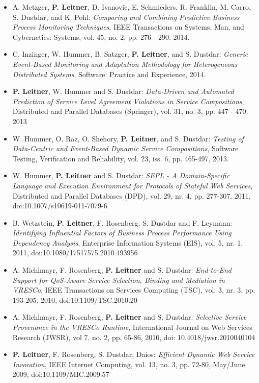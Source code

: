 \documentclass[paper=letter,fontsize=11pt]{scrartcl} %
\begin{document}
\begin{itemize}
  \item  A. Metzger, \textbf{P. Leitner}, D. Ivanovic, E. Schmieders, R. Franklin, M. Carro, S. Dustdar, and K. Pohl: \emph{Comparing and Combining Predictive Business Process Monitoring Techniques}, IEEE Transactions on Systems, Man, and Cybernetics: Systems, vol. 45, no. 2, pp. 276 - 290. 2014.
  \item C. Inzinger, W. Hummer, B. Satzger, \textbf{P. Leitner}, and S. Dustdar: \emph{Generic Event-Based Monitoring and Adaptation Methodology for Heterogeneous Distributed Systems}, Software: Practice and Experience, 2014.
  \item \textbf{P. Leitner}, W. Hummer and S. Dustdar: \emph{Data-Driven and Automated Prediction of Service Level Agreement Violations in Service Compositions}, Distributed and Parallel Databases (Springer), vol. 31, no. 3, pp. 447 - 470. 2013
  \item W. Hummer, O. Raz, O. Shehory, \textbf{P. Leitner}, and S. Dustdar: \emph{Testing of Data-Centric and Event-Based Dynamic Service Compositions}, Software Testing, Verification and Reliability, vol. 23, iss. 6, pp. 465-497, 2013.
\item W. Hummer, \textbf{P. Leitner} and S. Dustdar: \emph{SEPL - A
Domain-Specific Language and Execution Environment for Protocols of Stateful Web
Services}, Distributed and Parallel Databases (DPD), vol. 29, nr. 4, pp.
277-307. 2011, doi:10.1007/s10619-011-7079-6
\item B. Wetzstein, \textbf{P. Leitner}, F. Rosenberg, S. Dustdar and F. Leymann: \emph{Identifying Influential Factors of Business Process Performance Using Dependency Analysis}, Enterprise Information Systems (EIS), vol. 5, nr. 1. 2011, doi:10.1080/17517575.2010.493956
\item A. Michlmayr, F. Rosenberg, \textbf{P. Leitner} and S. Dustdar: \emph{End-to-End Support for QoS-Aware Service Selection, Binding and Mediation in VRESCo}, IEEE Transactions on Services Computing (TSC), vol. 3, nr. 3, pp. 193-205. 2010, doi:10.1109/TSC.2010.20
\item A. Michlmayr, F. Rosenberg, \textbf{P. Leitner} and S. Dustdar: \emph{Selective Service Provenance in the VRESCo Runtime}, International Journal on Web Services Research (JWSR), vol 7, no. 2, pp. 65-86, 2010, doi: 10.4018/jwsr.2010040104
\item \textbf{P. Leitner}, F. Rosenberg, S. Dustdar, Daios: \emph{Efficient Dynamic Web Service Invocation}, IEEE Internet Computing, vol. 13, no. 3, pp. 72-80, May/June 2009, doi:10.1109/MIC.2009.57
\end{itemize}
\end{document}
